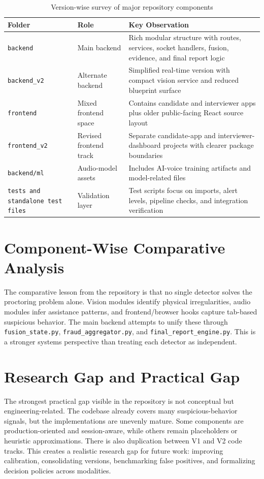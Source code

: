 \documentclass[12pt,a4paper]{extreport}
\begin{document}
\begin{table}[H]
\centering
\caption{Version-wise survey of major repository components}
\label{tab:version_survey}
\begin{tabularx}{\textwidth}{p{2.8cm}p{2.6cm}X}
\toprule
\textbf{Folder} & \textbf{Role} & \textbf{Key Observation}\\
\midrule
\texttt{backend} & Main backend & Rich modular structure with routes, services, socket handlers, fusion, evidence, and final report logic\\
\texttt{backend\_v2} & Alternate backend & Simplified real-time version with compact vision service and reduced blueprint surface\\
\texttt{frontend} & Mixed frontend space & Contains candidate and interviewer apps plus older public-facing React source layout\\
\texttt{frontend\_v2} & Revised frontend track & Separate candidate-app and interviewer-dashboard projects with clearer package boundaries\\
\texttt{backend/ml} & Audio-model assets & Includes AI-voice training artifacts and model-related files\\
\texttt{tests and standalone test files} & Validation layer & Test scripts focus on imports, alert levels, pipeline checks, and integration verification\\
\bottomrule
\end{tabularx}
\end{table}

\section{Component-Wise Comparative Analysis}
The comparative lesson from the repository is that no single detector solves the proctoring problem alone. Vision modules identify physical irregularities, audio modules infer assistance patterns, and frontend/browser hooks capture tab-based suspicious behavior. The main backend attempts to unify these through \texttt{fusion\_state.py}, \texttt{fraud\_aggregator.py}, and \texttt{final\_report\_engine.py}. This is a stronger systems perspective than treating each detector as independent.

\section{Research Gap and Practical Gap}
The strongest practical gap visible in the repository is not conceptual but engineering-related. The codebase already covers many suspicious-behavior signals, but the implementations are unevenly mature. Some components are production-oriented and session-aware, while others remain placeholders or heuristic approximations. There is also duplication between V1 and V2 code tracks. This creates a realistic research gap for future work: improving calibration, consolidating versions, benchmarking false positives, and formalizing decision policies across modalities.
\end{document}
